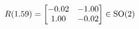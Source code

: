 \documentclass[preview]{standalone}
\begin{document}
\begin{align*}
\special{dvisvgm:raw <g id='unique000'>}R(1.59) = \begin{bmatrix} -0.02 & -1.00 \\ 1.00 & -0.02 \end{bmatrix} \in \text{SO}(2)\special{dvisvgm:raw </g>}
\end{align*}
\end{document}
